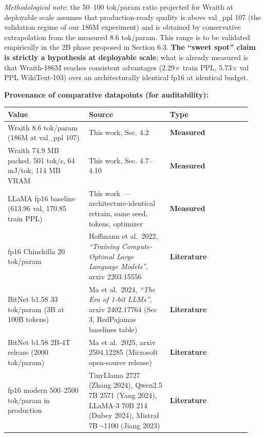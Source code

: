 \emph{Methodological note}: the 50--100 tok/param ratio projected for
Wraith at deployable scale assumes that production-ready quality is
above val\_ppl 107 (the validation regime of our 186M experiment) and is
obtained by conservative extrapolation from the measured 8.6 tok/param.
This range is to be validated empirically in the 2B phase proposed in
Section 6.3. \textbf{The ``sweet spot'' claim is strictly a hypothesis
at deployable scale}; what is already measured is that Wraith-186M
reaches consistent advantages (2.29× train PPL, 5.73× val PPL
WikiText-103) over an architecturally identical fp16 at identical
budget.

\textbf{Provenance of comparative datapoints (for auditability):}

{\def\LTcaptype{none} %
{\footnotesize\setlength{\tabcolsep}{3pt}
\begin{longtable}[]{@{}>{\raggedright\arraybackslash}p{0.313\linewidth}>{\raggedright\arraybackslash}p{0.313\linewidth}>{\raggedright\arraybackslash}p{0.313\linewidth}@{}}
\toprule\noalign{}
Value & Source & Type \\
\midrule\noalign{}
\endhead
\bottomrule\noalign{}
\endlastfoot
Wraith 8.6 tok/param (186M at val\_ppl 107) & This work, Sec. 4.2 &
\textbf{Measured} \\
Wraith 74.9 MB packed, 501 tok/s, 64 mJ/tok, 114 MB VRAM & This work,
Sec. 4.7--4.10 & \textbf{Measured} \\
LLaMA fp16 baseline (613.96 val, 170.85 train PPL) & This work ---
architecture-identical retrain, same seed, tokens, optimizer &
\textbf{Measured} \\
fp16 Chinchilla 20 tok/param & Hoffmann et al.~2022, \emph{``Training
Compute-Optimal Large Language Models''}, arxiv 2203.15556 &
\textbf{Literature} \\
BitNet b1.58 33 tok/param (3B at 100B tokens) & Ma et al.~2024,
\emph{``The Era of 1-bit LLMs''}, arxiv 2402.17764 (Sec 3, RedPajamas
baselines table) & \textbf{Literature} \\
BitNet b1.58 2B-4T release (2000 tok/param) & Ma et al.~2025, arxiv
2504.12285 (Microsoft open-source release) & \textbf{Literature} \\
fp16 modern 500--2500 tok/param in production & TinyLlama 2727 (Zhang
2024), Qwen2.5 7B 2571 (Yang 2024), LLaMA-3 70B 214 (Dubey 2024),
Mistral 7B \textasciitilde1100 (Jiang 2023) & \textbf{Literature} \\
\end{longtable}
}
}

